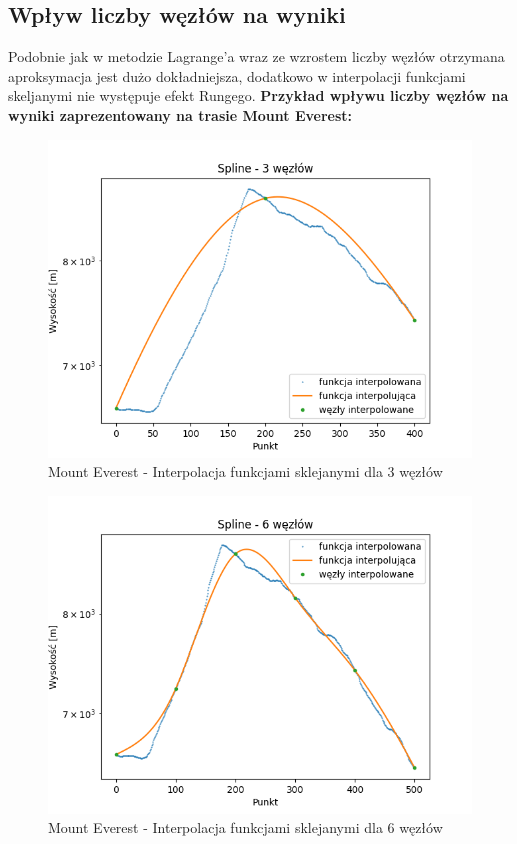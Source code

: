 \documentclass[12pt]{extarticle}
\begin{document}
\subsection*{Wpływ liczby węzłów na wyniki}
Podobnie jak w metodzie Lagrange'a wraz ze wzrostem liczby węzłów otrzymana aproksymacja jest dużo dokładniejsza, dodatkowo w interpolacji funkcjami skeljanymi nie występuje efekt Rungego.
\newpage
\textbf{Przykład wpływu liczby węzłów na wyniki zaprezentowany na trasie Mount Everest:}
\begin{figure}[H]
    \centering
    \includegraphics[scale=0.8]{interpolation_MountEverest_Spline_3.png}
    \caption{Mount Everest - Interpolacja funkcjami sklejanymi dla 3 węzłów}
\end{figure}
\begin{figure}[H]
    \centering
    \includegraphics[scale=0.8]{interpolation_MountEverest_Spline_6.png}
    \caption{Mount Everest - Interpolacja funkcjami sklejanymi dla 6 węzłów}
\end{figure}
\end{document}
